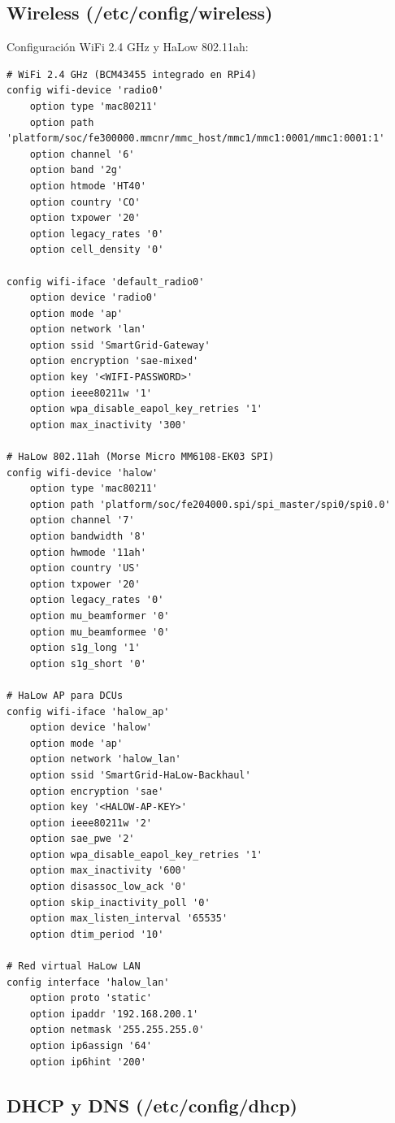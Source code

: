\subsection{Wireless (/etc/config/wireless)}

Configuración WiFi 2.4 GHz y HaLow 802.11ah:

\begin{verbatim}
# WiFi 2.4 GHz (BCM43455 integrado en RPi4)
config wifi-device 'radio0'
    option type 'mac80211'
    option path 'platform/soc/fe300000.mmcnr/mmc_host/mmc1/mmc1:0001/mmc1:0001:1'
    option channel '6'
    option band '2g'
    option htmode 'HT40'
    option country 'CO'
    option txpower '20'
    option legacy_rates '0'
    option cell_density '0'

config wifi-iface 'default_radio0'
    option device 'radio0'
    option mode 'ap'
    option network 'lan'
    option ssid 'SmartGrid-Gateway'
    option encryption 'sae-mixed'
    option key '<WIFI-PASSWORD>'
    option ieee80211w '1'
    option wpa_disable_eapol_key_retries '1'
    option max_inactivity '300'

# HaLow 802.11ah (Morse Micro MM6108-EK03 SPI)
config wifi-device 'halow'
    option type 'mac80211'
    option path 'platform/soc/fe204000.spi/spi_master/spi0/spi0.0'
    option channel '7'
    option bandwidth '8'
    option hwmode '11ah'
    option country 'US'
    option txpower '20'
    option legacy_rates '0'
    option mu_beamformer '0'
    option mu_beamformee '0'
    option s1g_long '1'
    option s1g_short '0'

# HaLow AP para DCUs
config wifi-iface 'halow_ap'
    option device 'halow'
    option mode 'ap'
    option network 'halow_lan'
    option ssid 'SmartGrid-HaLow-Backhaul'
    option encryption 'sae'
    option key '<HALOW-AP-KEY>'
    option ieee80211w '2'
    option sae_pwe '2'
    option wpa_disable_eapol_key_retries '1'
    option max_inactivity '600'
    option disassoc_low_ack '0'
    option skip_inactivity_poll '0'
    option max_listen_interval '65535'
    option dtim_period '10'

# Red virtual HaLow LAN
config interface 'halow_lan'
    option proto 'static'
    option ipaddr '192.168.200.1'
    option netmask '255.255.255.0'
    option ip6assign '64'
    option ip6hint '200'
\end{verbatim}

\subsection{DHCP y DNS (/etc/config/dhcp)}

